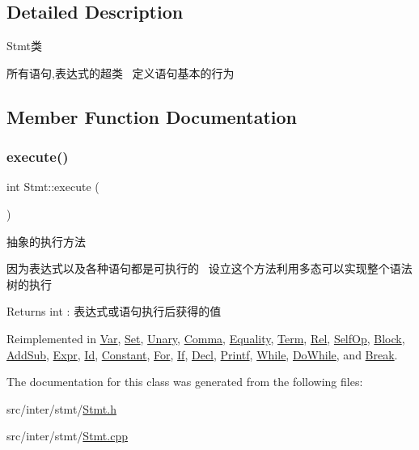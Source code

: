 \subsection{Detailed Description}
Stmt类 

所有语句,表达式的超类~\newline
定义语句基本的行为 

\subsection{Member Function Documentation}
\mbox{\label{class_stmt_abdc3261770c3c5bd3ce5b3ba6eedfaa4}} 
\subsubsection{\texorpdfstring{execute()}{execute()}}
{\footnotesize\ttfamily int Stmt\+::execute (\begin{DoxyParamCaption}{ }\end{DoxyParamCaption})\hspace{0.3cm}{\ttfamily [virtual]}}



抽象的执行方法 

因为表达式以及各种语句都是可执行的~\newline
设立这个方法利用多态可以实现整个语法树的执行~\newline
 \begin{DoxyReturn}{Returns}
int \+: 表达式或语句执行后获得的值 
\end{DoxyReturn}


Reimplemented in \hyperlink{class_var_a9dc96e803f7b0f9aa519c2c0e0a6bd8f}{Var}, \hyperlink{class_set_a7776ba36f3af8b09772b36927beb5f5c}{Set}, \hyperlink{class_unary_af42edff1ee4718a9afeb7127e41af758}{Unary}, \hyperlink{class_comma_aab9ca2bb70a10abd2fb263de745f843a}{Comma}, \hyperlink{class_equality_a0255c33af70613b006b03a329ed329ff}{Equality}, \hyperlink{class_term_ac2d20115da73f9425e5d390856a211a1}{Term}, \hyperlink{class_rel_a82b2f3b75a2b9e81631f2659d42a36d1}{Rel}, \hyperlink{class_self_op_ab452bcad1cd4f1286813b1f737583818}{Self\+Op}, \hyperlink{class_block_a8e03f15df4e43cd6c802341c3bda6b33}{Block}, \hyperlink{class_add_sub_a73c0513a31a5400fdfc79ce877a1c3b9}{Add\+Sub}, \hyperlink{class_expr_aff6a2e6eaa460e2a3db28ebdab089b51}{Expr}, \hyperlink{class_id_ae43a9ffecbbc0ac4fd041b8e8e3c3de0}{Id}, \hyperlink{class_constant_ab5c55607bcff5ce70131a588b6bdbed7}{Constant}, \hyperlink{class_for_ad099d6d48c640dd5127285e59bbaba15}{For}, \hyperlink{class_if_aeadf929258ccd07a239879c118fb152f}{If}, \hyperlink{class_decl_ad6495a4245a45dcdcd05e239c8db4a8b}{Decl}, \hyperlink{class_printf_a0343199e28647ced40b9d74a284ff5f3}{Printf}, \hyperlink{class_while_a23b58565983130bb54577f4399ffd822}{While}, \hyperlink{class_do_while_adb6934e033f44c6b52b1079faf1d84cf}{Do\+While}, and \hyperlink{class_break_a554fd4cae05d203145d62868f73004d4}{Break}.



The documentation for this class was generated from the following files\+:\begin{DoxyCompactItemize}
\item 
src/inter/stmt/\hyperlink{_stmt_8h}{Stmt.\+h}\item 
src/inter/stmt/\hyperlink{_stmt_8cpp}{Stmt.\+cpp}\end{DoxyCompactItemize}
